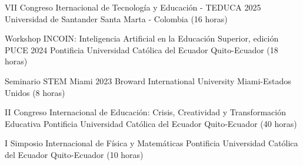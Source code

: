 \documentclass[
    a4paper,
    maincolor=cvblue!70!blue,
    sidecolor=gray!30,
    sectioncolor=cvblue!70!blue,
    sidebarwidth=7.5cm,
    topbottommargin=20pt,
    leftrightmargin=20pt,
]{fortysecondscv}
\begin{document}
    

    
    

    
    
    

    {VII Congreso Iternacional de Tecnología y Educación - TEDUCA 2025}
    {Universidad de Santander}
    {Santa Marta - Colombia (16 horas)}
    
    {Workshop INCOIN: Inteligencia Artificial en la Educación Superior, edición PUCE 2024}
    {Pontificia Universidad Católica del Ecuador}
    {Quito-Ecuador (18 horas)}
    
    {Seminario STEM Miami 2023}
    {Broward International University}
    {Miami-Estados Unidos (8 horas)}

    {II Congreso Internacional de Educación: Crisis, Creatividad y Transformación Educativa}
    {Pontificia Universidad Católica del Ecuador}
    {Quito-Ecuador (40 horas)}

    {I Simposio Internacional de Física y Matemáticas}
    {Pontificia Universidad Católica del Ecuador}
    {Quito-Ecuador (10 horas)}
\end{document}
